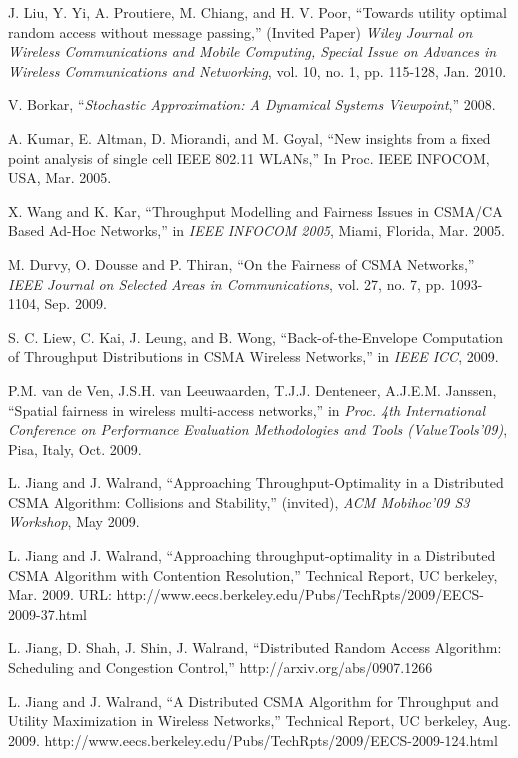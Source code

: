 \documentclass{IEEEtran}
\begin{document}
\begin{thebibliography}{32}
J. Liu, Y. Yi, A. Proutiere, M. Chiang, and H. V.
Poor, {}``Towards utility optimal random access without message passing,''
(Invited Paper) \emph{Wiley Journal on Wireless Communications and
Mobile Computing, Special Issue on Advances in Wireless Communications
and Networking}, vol. 10, no. 1, pp. 115-128, Jan. 2010. 

V. Borkar, {}``\emph{Stochastic Approximation: A
Dynamical Systems Viewpoint},'' 2008.

A. Kumar, E. Altman, D. Miorandi, and M. Goyal,
{}``New insights from a fixed point analysis of single cell IEEE
802.11 WLANs,'' In Proc. IEEE INFOCOM, USA, Mar. 2005.

X. Wang and K. Kar, {}``Throughput Modelling and Fairness
Issues in CSMA/CA Based Ad-Hoc Networks,'' in\emph{ IEEE INFOCOM
2005}, Miami, Florida, Mar. 2005.

M. Durvy, O. Dousse and P. Thiran, {}``On the Fairness
of CSMA Networks,'' \emph{IEEE Journal on Selected Areas in Communications},
vol. 27, no. 7, pp. 1093-1104, Sep. 2009.

S. C. Liew, C. Kai, J. Leung, and B. Wong, {}``Back-of-the-Envelope
Computation of Throughput Distributions in CSMA Wireless Networks,''
in \emph{IEEE ICC}, 2009.

P.M. van de Ven, J.S.H. van Leeuwaarden, T.J.J.
Denteneer, A.J.E.M. Janssen, {}``Spatial fairness in wireless multi-access
networks,'' in \emph{Proc. 4th International Conference on Performance
Evaluation Methodologies and Tools (ValueTools'09)}, Pisa, Italy,
Oct. 2009.

L. Jiang and J. Walrand, {}``Approaching Throughput-Optimality
in a Distributed CSMA Algorithm: Collisions and Stability,'' (invited),
\emph{ACM Mobihoc'09 S3 Workshop}, May 2009. 

L. Jiang and J. Walrand, {}``Approaching
throughput-optimality in a Distributed CSMA Algorithm with Contention
Resolution,'' Technical Report, UC berkeley, Mar. 2009. URL: http://www.eecs.berkeley.edu/Pubs/TechRpts/2009/EECS-2009-37.html

L. Jiang, D. Shah, J. Shin, J. Walrand, {}``Distributed
Random Access Algorithm: Scheduling and Congestion Control,'' http://arxiv.org/abs/0907.1266

L. Jiang and J. Walrand, {}``A Distributed
CSMA Algorithm for Throughput and Utility Maximization in Wireless
Networks,'' Technical Report, UC berkeley, Aug. 2009. http://www.eecs.berkeley.edu/Pubs/TechRpts/2009/EECS-2009-124.html
\end{thebibliography}
\end{document}
